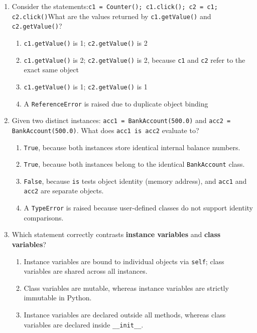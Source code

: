 \documentclass[11pt,a4paper]{article}
\begin{document}
\begin{enumerate}[label=\textbf{Q\arabic*.},leftmargin=2em,itemsep=1.5pt,topsep=1pt,resume]
\item Consider the statements:\newline\texttt{c1 = Counter(); c1.click(); c2 = c1; c2.click()}\newline What are the values returned by \texttt{c1.getValue()} and \texttt{c2.getValue()}?
\begin{enumerate}[label=\Alph*.,leftmargin=2em]
\item \texttt{c1.getValue()} is 1; \texttt{c2.getValue()} is 2
\item \texttt{c1.getValue()} is 2; \texttt{c2.getValue()} is 2, because \texttt{c1} and \texttt{c2} refer to the exact same object
\item \texttt{c1.getValue()} is 1; \texttt{c2.getValue()} is 1
\item A \texttt{ReferenceError} is raised due to duplicate object binding
\end{enumerate}
\item Given two distinct instances: \texttt{acc1 = BankAccount(500.0)} and \texttt{acc2 = BankAccount(500.0)}. What does \texttt{acc1 is acc2} evaluate to?
\begin{enumerate}[label=\Alph*.,leftmargin=2em]
\item \texttt{True}, because both instances store identical internal balance numbers.
\item \texttt{True}, because both instances belong to the identical \texttt{BankAccount} class.
\item \texttt{False}, because \texttt{is} tests object identity (memory address), and \texttt{acc1} and \texttt{acc2} are separate objects.
\item A \texttt{TypeError} is raised because user-defined classes do not support identity comparisons.
\end{enumerate}
\item Which statement correctly contrasts \textbf{instance variables} and \textbf{class variables}?
\begin{enumerate}[label=\Alph*.,leftmargin=2em]
\item Instance variables are bound to individual objects via \texttt{self}; class variables are shared across all instances.
\item Class variables are mutable, whereas instance variables are strictly immutable in Python.
\item Instance variables are declared outside all methods, whereas class variables are declared inside \texttt{\_\_init\_\_}.

\end{enumerate}
\end{enumerate}
\end{document}
